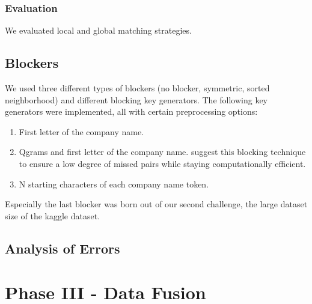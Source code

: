 \documentclass[11pt,titlepage,oneside,openany]{book}
\begin{document}
\subsection{Evaluation}

We evaluated local and global matching strategies. 




\section{Blockers}
\label{sec:blockers}

We used three different types of blockers (no blocker, symmetric, sorted neighborhood) and different blocking key generators. The following key generators were implemented, all with certain preprocessing options: \begin{enumerate}
	\item First letter of the company name.
	\item Qgrams and first letter of the company name. \cite{gravano_approximate_nodate} suggest this blocking technique to ensure a low degree of missed pairs while staying computationally efficient. %
	\item N starting characters of each company name token.
\end{enumerate}

Especially the last blocker was born out of our second challenge, the large dataset size of the kaggle dataset.


\section{Analysis of Errors}
\label{sec:errors}


\chapter{Phase III - Data Fusion}
\label{cha:data-fusion}
\end{document}
